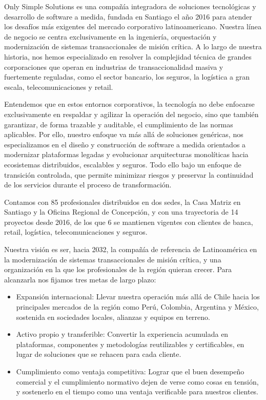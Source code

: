 \documentclass[11pt]{article}
\providecommand{\tightlist}{%
  \setlength{\itemsep}{0pt}\setlength{\parskip}{0pt}}
\begin{document}
Only Simple Solutions es una compañía integradora de soluciones tecnológicas y desarrollo de software a medida, fundada en Santiago el año 2016 para atender los desafíos más exigentes del mercado corporativo latinoamericano. Nuestra línea de negocio se centra exclusivamente en la ingeniería, orquestación y modernización de sistemas transaccionales de misión crítica. A lo largo de nuestra historia, nos hemos especializado en resolver la complejidad técnica de grandes corporaciones que operan en industrias de transaccionalidad masiva y fuertemente reguladas, como el sector bancario, los seguros, la logística a gran escala, telecomunicaciones y retail.

Entendemos que en estos entornos corporativos, la tecnología no debe enfocarse exclusivamente en respaldar y agilizar la operación del negocio, sino que también garantizar, de forma trazable y auditable, el cumplimiento de las normas aplicables. Por ello, nuestro enfoque va más allá de soluciones genéricas, nos especializamos en el diseño y construcción de software a medida orientados a modernizar plataformas legadas y evolucionar arquitecturas monolíticas hacia ecosistemas distribuidos, escalables y seguros. Todo ello bajo un enfoque de transición controlada, que permite minimizar riesgos y preservar la continuidad de los servicios durante el proceso de transformación.

Contamos con 85 profesionales distribuidos en dos sedes, la Casa Matriz en Santiago y la Oficina Regional de Concepción, y con una trayectoria de 14 proyectos desde 2016, de los que 6 se mantienen vigentes con clientes de banca, retail, logística, telecomunicaciones y seguros.

Nuestra visión es ser, hacia 2032, la compañía de referencia de Latinoamérica en la modernización de sistemas transaccionales de misión crítica, y una organización en la que los profesionales de la región quieran crecer. Para alcanzarla nos fijamos tres metas de largo plazo:

\begin{itemize}
\tightlist
\item
  Expansión internacional: Llevar nuestra operación más allá de Chile hacia los principales mercados de la región como Perú, Colombia, Argentina y México, sostenida en sociedades locales, alianzas y equipos en terreno.
\item
  Activo propio y transferible: Convertir la experiencia acumulada en plataformas, componentes y metodologías reutilizables y certificables, en lugar de soluciones que se rehacen para cada cliente.
\item
  Cumplimiento como ventaja competitiva: Lograr que el buen desempeño comercial y el cumplimiento normativo dejen de verse como cosas en tensión, y sostenerlo en el tiempo como una ventaja verificable para nuestros clientes.
\end{itemize}
\end{document}
